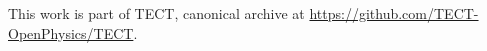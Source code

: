 \begin{acknowledgments}
This work is part of TECT, canonical archive at
\url{https://github.com/TECT-OpenPhysics/TECT}.
\end{acknowledgments}





